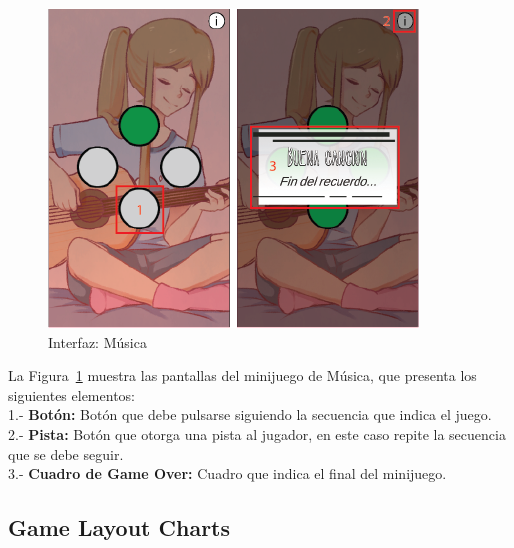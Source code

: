 \newpage
\begin{figure}
    \centering
    \includegraphics{imgs/hud-musica.png}
    \caption{Interfaz: Música}
    \label{fig:hud-musica}
\end{figure}

La Figura~\ref{fig:hud-musica} muestra las pantallas del minijuego de Música, que presenta los siguientes elementos:\\
1.- \textbf{Botón:} Botón que debe pulsarse siguiendo la secuencia que indica el juego.\\
2.- \textbf{Pista:} Botón que otorga una pista al jugador, en este caso repite la secuencia que se debe seguir.\\
3.- \textbf{Cuadro de Game Over:} Cuadro que indica el final del minijuego.

\newpage
\subsection{Game Layout Charts}

